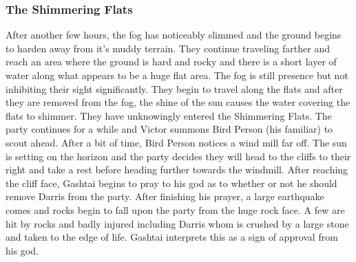 \subsubsection{The Shimmering Flats}

After another few hours, the fog has noticeably slimmed and the ground begins to harden away from it's muddy terrain. They continue traveling farther and reach an area where the ground is hard and rocky and there is a short layer of water along what appears to be a huge flat area. The fog is still presence but not inhibiting their sight significantly. They begin to travel along the flats and after they are removed from the fog, the shine of the sun causes the water covering the flats to shimmer. They have unknowingly entered the Shimmering Flats. The party continues for a while and Victor summons Bird Person (his familiar) to scout ahead. After a bit of time, Bird Person notices a wind mill far off. The sun is setting on the horizon and the party decides they will head to the cliffs to their right and take a rest before heading further towards the windmill. After reaching the cliff face, Gashtai begins to pray to his god as to whether or not he should remove Darris from the party. After finishing his prayer, a large earthquake comes and rocks begin to fall upon the party from the huge rock face. A few are hit by rocks and badly injured including Darris whom is crushed by a large stone and taken to the edge of life. Gashtai interprets this as a sign of approval from his god.

